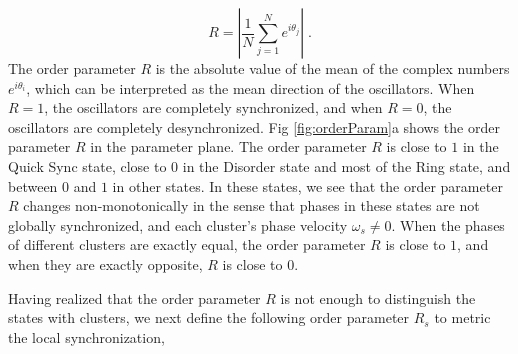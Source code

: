\documentclass[%
 aip,
 amsmath,amssymb,
 reprint,%
]{revtex4-1}
\begin{document}
\begin{equation}
    R=\left| \frac{1}{N}\sum_{j=1}^N{e^{i\theta _j}} \right|\;.
\end{equation}
The order parameter $R$ is the absolute value of the mean of the complex numbers $e^{i\theta _i}$, which can be interpreted as the mean direction of the oscillators. When $R=1$, the oscillators are completely synchronized, and when $R=0$, the oscillators are completely desynchronized. Fig \ref{fig:orderParam}a shows the order parameter $R$ in the parameter plane. The order parameter $R$ is close to $1$ in the Quick Sync state, close to $0$ in the Disorder state and most of the Ring state, and between $0$ and $1$ in other states. In these states, we see that the order parameter $R$ changes non-monotonically in the sense that phases in these states are not globally synchronized, and each cluster's phase velocity $\omega_s\ne 0$. When the phases of different clusters are exactly equal, the order parameter $R$ is close to $1$, and when they are exactly opposite, $R$ is close to $0$.

Having realized that the order parameter $R$ is not enough to distinguish the states with clusters, we next define the following order parameter $R_s$ to metric the local synchronization,
\end{document}
